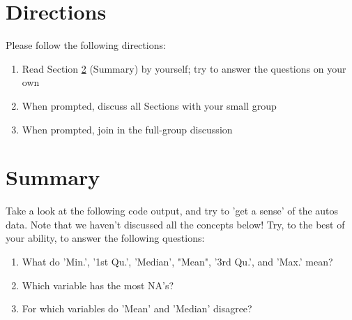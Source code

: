 \documentclass{article}
\begin{document}
\section{Directions}
Please follow the following directions:

\begin{enumerate}
\item Read Section \ref{sec:summary} (Summary) by yourself; try to answer the
  questions on your own
\item When prompted, discuss all Sections with your small group
\item When prompted, join in the full-group discussion
\end{enumerate}

\section{Summary} \label{sec:summary}
Take a look at the following code output, and try to 'get a sense' of the autos
data. Note that we haven't discussed all the concepts below! Try, to the best of
your ability, to answer the following questions:

\begin{enumerate}
\item What do 'Min.', '1st Qu.', 'Median', "Mean", '3rd Qu.', and 'Max.' mean?
\item Which variable has the most NA's?
\item For which variables do 'Mean' and 'Median' disagree?
\end{enumerate}
\end{document}
